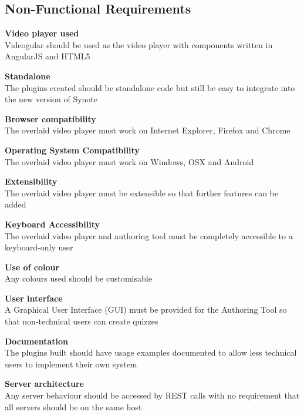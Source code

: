 \subsection{Non-Functional Requirements}
\begin{requirement}[label=\textbf{N\arabic*}]
\item \textbf{Video player used} \hfill \\ Videogular should be used as the video player with components written in AngularJS and HTML5 \label{Req:Video player used}
\item \textbf{Standalone} \hfill \\ The plugins created should be standalone code but still be easy to integrate into the new version of Synote \label{Req:Standalone}
\item \textbf{Browser compatibility} \hfill \\ The overlaid video player must work on Internet Explorer, Firefox and Chrome \label{Req:Browser compatibility}
\item \textbf{Operating System Compatibility} \hfill \\ The overlaid video player must work on Windows, OSX and Android \label{Req:OS compatibility}
\item \textbf{Extensibility} \hfill \\ The overlaid video player must be extensible so that further features can be added \label{Req:Extensibility} 
\item \textbf{Keyboard Accessibility} \hfill \\ The overlaid video player and authoring tool must be completely accessible to a keyboard-only user \label{Req:Keyboard accessibility}
\item \textbf{Use of colour} \hfill \\ Any colours used should be customisable \label{Req:Use of colour}
\item \textbf{User interface} \hfill \\ A Graphical User Interface (GUI) must be provided for the Authoring Tool so that non-technical users can create quizzes \label{Req:User interface}
\item \textbf{Documentation} \hfill \\ The plugins built should have usage examples documented to allow less technical users to implement their own system \label{Req:Documentation}
\item \textbf{Server architecture} \hfill \\ Any server behaviour should be accessed by \gls{REST} calls with no requirement that all servers should be on the same host \label{Req:Server architecture}
\end{requirement}

